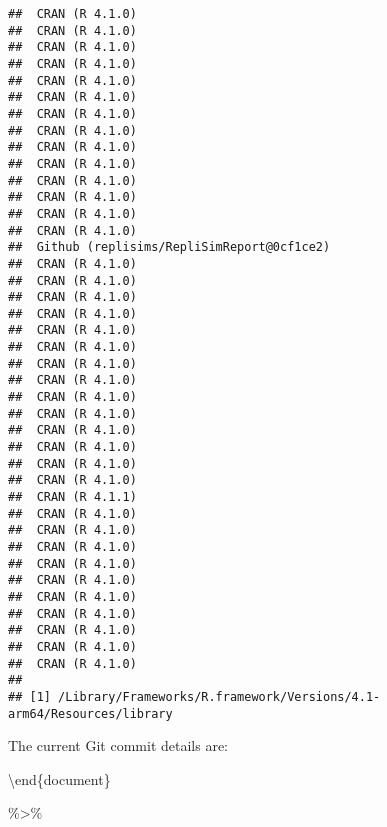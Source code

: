 \documentclass[10,a4paperpaper,]{article}
\begin{document}
\begin{verbatim}
##  CRAN (R 4.1.0)                           
##  CRAN (R 4.1.0)                           
##  CRAN (R 4.1.0)                           
##  CRAN (R 4.1.0)                           
##  CRAN (R 4.1.0)                           
##  CRAN (R 4.1.0)                           
##  CRAN (R 4.1.0)                           
##  CRAN (R 4.1.0)                           
##  CRAN (R 4.1.0)                           
##  CRAN (R 4.1.0)                           
##  CRAN (R 4.1.0)                           
##  CRAN (R 4.1.0)                           
##  CRAN (R 4.1.0)                           
##  CRAN (R 4.1.0)                           
##  Github (replisims/RepliSimReport@0cf1ce2)
##  CRAN (R 4.1.0)                           
##  CRAN (R 4.1.0)                           
##  CRAN (R 4.1.0)                           
##  CRAN (R 4.1.0)                           
##  CRAN (R 4.1.0)                           
##  CRAN (R 4.1.0)                           
##  CRAN (R 4.1.0)                           
##  CRAN (R 4.1.0)                           
##  CRAN (R 4.1.0)                           
##  CRAN (R 4.1.0)                           
##  CRAN (R 4.1.0)                           
##  CRAN (R 4.1.0)                           
##  CRAN (R 4.1.0)                           
##  CRAN (R 4.1.0)                           
##  CRAN (R 4.1.1)                           
##  CRAN (R 4.1.0)                           
##  CRAN (R 4.1.0)                           
##  CRAN (R 4.1.0)                           
##  CRAN (R 4.1.0)                           
##  CRAN (R 4.1.0)                           
##  CRAN (R 4.1.0)                           
##  CRAN (R 4.1.0)                           
##  CRAN (R 4.1.0)                           
##  CRAN (R 4.1.0)                           
##  CRAN (R 4.1.0)                           
## 
## [1] /Library/Frameworks/R.framework/Versions/4.1-arm64/Resources/library
\end{verbatim}

The current Git commit details are:

\textbackslash end\{document\}

\%\textgreater\%
\end{document}
